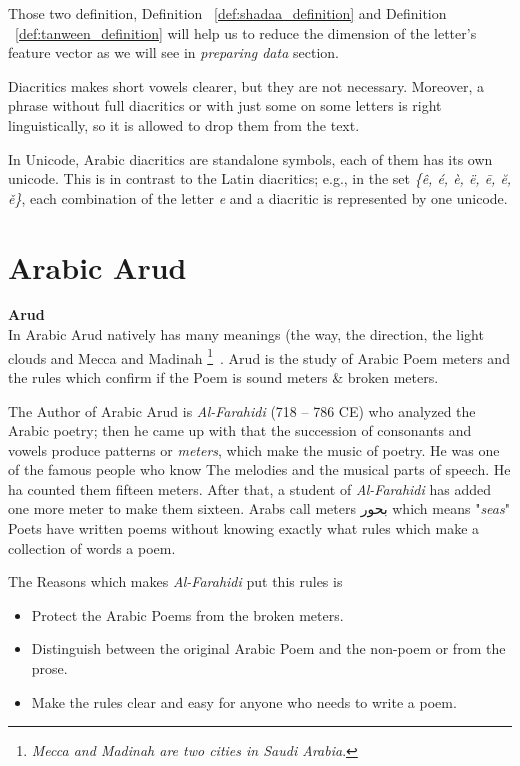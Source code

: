Those two definition, Definition ~\ref{def:shadaa_definition} and Definition ~\ref{def:tanween_definition}  will help us to reduce the dimension of the letter's feature vector as we will see in \textit{preparing data} section.


Diacritics makes short vowels clearer, but they are not necessary.
Moreover, a phrase without full diacritics or with just some on some letters is
right linguistically, so it is allowed to drop them from the text.

In Unicode, Arabic diacritics are standalone symbols, each of them has its own
unicode. This is in contrast to the Latin diacritics; e.g., in the set
\textit{\{ê, é, è, ë, ē, ĕ, ě\}}, each combination of the letter \textit{e} and a diacritic is represented by one unicode.

\newpage

\section{Arabic Arud}
 


\begin{definition}\label{def:arud}
  \textbf{Arud} \hfill \\
  In Arabic Arud natively has many meanings (the way, the direction, the light clouds and Mecca and Madinah \footnote{\textit{Mecca and Madinah are two cities in  Saudi Arabia}.}~\cite{AlQuaed}. Arud is the study of Arabic Poem meters and the rules which confirm if the Poem is sound meters \& broken meters.
\end{definition}
 
The Author of Arabic Arud  is \textit{Al-Farahidi} (718 – 786 CE) who analyzed the Arabic poetry; then he came up with that the succession of consonants and vowels produce patterns or \textit{meters}, which make the music of poetry. He was one of the famous people who know The melodies and the musical parts of speech. He ha counted them fifteen meters.  After that, a student of \textit{Al-Farahidi} has added one more meter to make them sixteen. Arabs call meters \textarabic{بحور} which means "\textit{seas}" Poets have written poems without knowing exactly what rules which make a collection of words a poem.

The Reasons which makes \textit{Al-Farahidi} put this rules is

  \begin{itemize}
  \item Protect the Arabic Poems from the broken meters.
  \item Distinguish between the original Arabic Poem and the non-poem or from the prose.
    \item Make the rules clear and easy for anyone who needs to write a poem.
  \end{itemize}

